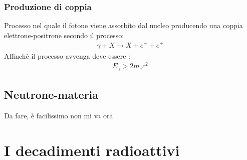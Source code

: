 \subsection{Produzione di coppia}
Processo nel quale il fotone viene assorbito dal nucleo producendo una coppia elettrone-positrone 
secondo il processo:
\begin{align*}
    \gamma + X \rightarrow X + e^{-} + e^{+}
\end{align*}
Affinchè il processo avvenga deve essere :
\begin{align*}
    E_{\gamma} > 2m_{e}c^2
\end{align*}
\section{Neutrone-materia}
Da fare, è facilissimo non mi va ora
\newpage
\chapter{I decadimenti radioattivi}

